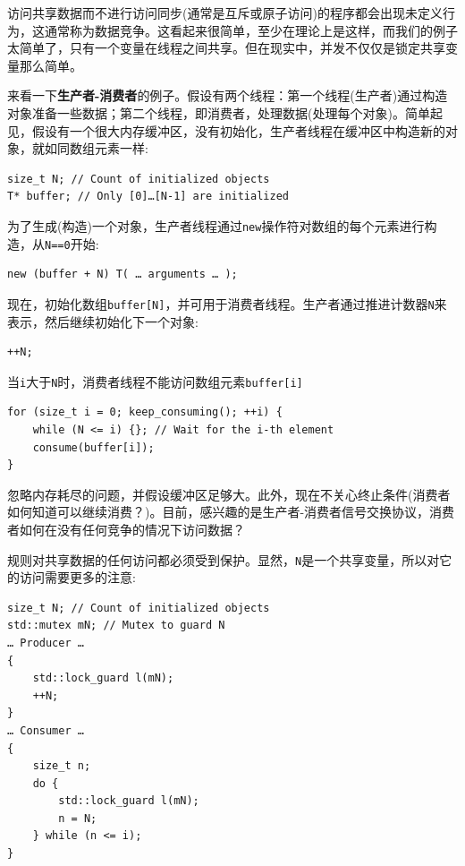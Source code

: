 
访问共享数据而不进行访问同步(通常是互斥或原子访问)的程序都会出现未定义行为，这通常称为数据竞争。这看起来很简单，至少在理论上是这样，而我们的例子太简单了，只有一个变量在线程之间共享。但在现实中，并发不仅仅是锁定共享变量那么简单。


来看一下\textbf{生产者-消费者}的例子。假设有两个线程：第一个线程(生产者)通过构造对象准备一些数据；第二个线程，即消费者，处理数据(处理每个对象)。简单起见，假设有一个很大内存缓冲区，没有初始化，生产者线程在缓冲区中构造新的对象，就如同数组元素一样:

\begin{lstlisting}[style=styleCXX]
size_t N; // Count of initialized objects
T* buffer; // Only [0]…[N-1] are initialized
\end{lstlisting}

为了生成(构造)一个对象，生产者线程通过\texttt{new}操作符对数组的每个元素进行构造，从\texttt{N==0}开始:

\begin{lstlisting}[style=styleCXX]
new (buffer + N) T( … arguments … );
\end{lstlisting}

现在，初始化数组\texttt{buffer[N]}，并可用于消费者线程。生产者通过推进计数器\texttt{N}来表示，然后继续初始化下一个对象:

\begin{lstlisting}[style=styleCXX]
++N;
\end{lstlisting}

当\texttt{i}大于\texttt{N}时，消费者线程不能访问数组元素\texttt{buffer[i]}

\begin{lstlisting}[style=styleCXX]
for (size_t i = 0; keep_consuming(); ++i) {
	while (N <= i) {}; // Wait for the i-th element
	consume(buffer[i]);
}
\end{lstlisting}

忽略内存耗尽的问题，并假设缓冲区足够大。此外，现在不关心终止条件(消费者如何知道可以继续消费？)。目前，感兴趣的是生产者-消费者信号交换协议，消费者如何在没有任何竞争的情况下访问数据？

规则对共享数据的任何访问都必须受到保护。显然，\texttt{N}是一个共享变量，所以对它的访问需要更多的注意:

\begin{lstlisting}[style=styleCXX]
size_t N; // Count of initialized objects
std::mutex mN; // Mutex to guard N
… Producer …
{
	std::lock_guard l(mN);
	++N;
}
… Consumer …
{
	size_t n;
	do {
		std::lock_guard l(mN);
		n = N;
	} while (n <= i);
}
\end{lstlisting}


